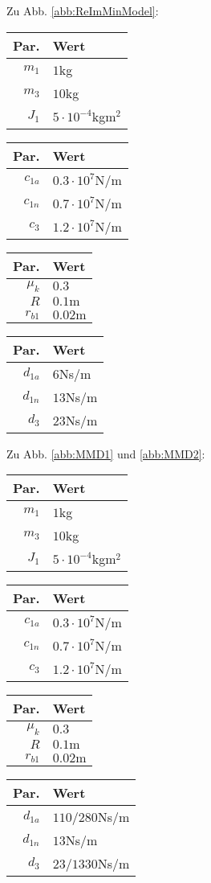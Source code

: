 Zu Abb. \ref{abb:ReImMinModel}:
\begin{center}
\begin{tabular}{r|l}
Par. &Wert\\\hline
$m_1$&$1$kg\\
$m_3$&$10$kg\\
$J_1$&$5\cdot 10^{-4}$kgm$^{2}$
\end{tabular}\hfill
\begin{tabular}{r|l}
Par. &Wert\\\hline
$c_{1a}$&$0.3\cdot10^{7}$N/m\\
$c_{1n}$&$0.7\cdot10^{7}$N/m \\
$c_{3}$ &$1.2\cdot10^{7}$N/m
\end{tabular}\hfill
\begin{tabular}{r|l}
Par. &Wert\\\hline
$\mu_k$& $0.3$\\
$R$&$0.1\textrm{m}$ \\
$r_{b1}$&$ 0.02\textrm{m}$
\end{tabular}\hfill
\begin{tabular}{r|l}
Par. &Wert\\\hline
$d_{1a}$&$6$Ns/m\\
$d_{1n}$&$13$Ns/m\\
$d_{3}$&$23$Ns/m
\end{tabular}
\end{center}

Zu Abb. \ref{abb:MMD1} und \ref{abb:MMD2}: 
\begin{center}
\begin{tabular}{r|l}
Par. &Wert\\\hline
$m_1$&$1$kg\\
$m_3$&$10$kg\\
$J_1$&$5\cdot 10^{-4}$kgm$^{2}$
\end{tabular} \hfill
\begin{tabular}{r|l}
Par. &Wert\\\hline
$c_{1a}$&$0.3\cdot10^{7}$N/m\\
$c_{1n}$&$0.7\cdot10^{7}$N/m \\
$c_{3}$ &$1.2\cdot10^{7}$N/m
\end{tabular} \hfill
\begin{tabular}{r|l}
Par. &Wert\\\hline
$\mu_k$& $0.3$\\
$R$&$0.1\textrm{m}$ \\
$r_{b1}$&$ 0.02\textrm{m}$
\end{tabular} \hfill
\begin{tabular}{r|l}
Par. &Wert\\\hline
$d_{1a}$&$110/280$Ns/m\\
$d_{1n}$&$13$Ns/m\\
$d_{3}$&$23/1330$Ns/m
\end{tabular} 
\end{center}

